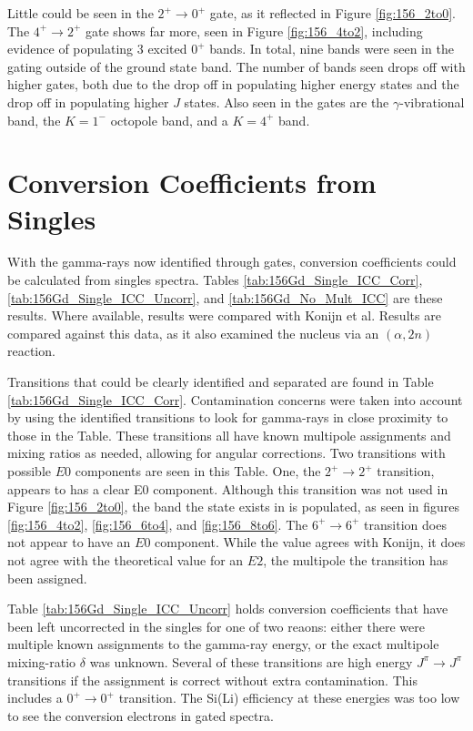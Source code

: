 Little could be seen in the $2^+\rightarrow0^+$ gate, as it reflected in Figure \ref{fig:156_2to0}. The $4^+\rightarrow2^+$ gate shows far more, seen in Figure \ref{fig:156_4to2}, including evidence of populating 3 excited $0^+$ bands. In total, nine bands were seen in the gating outside of the ground state band. The number of bands seen drops off with higher gates, both due to the drop off in populating higher energy states and the drop off in populating higher $J$ states. Also seen in the gates are the $\gamma$-vibrational band, the $K=1^-$ octopole band, and a $K=4^+$ band.

\section{Conversion Coefficients from Singles}

With the gamma-rays now identified through gates, conversion coefficients could be calculated from singles spectra. Tables \ref{tab:156Gd_Single_ICC_Corr}, \ref{tab:156Gd_Single_ICC_Uncorr}, and \ref{tab:156Gd_No_Mult_ICC} are these results. Where available, results were compared with Konijn et al\citep{konijn81:_156gd}. Results are compared against this data, as it also examined the nucleus via an $(\alpha,2n)$ reaction.

Transitions that could be clearly identified and separated are found in Table \ref{tab:156Gd_Single_ICC_Corr}. Contamination concerns were taken into account by using the identified transitions to look for gamma-rays in close proximity to those in the Table. These transitions all have known multipole assignments and mixing ratios as needed, allowing for angular corrections. Two transitions with possible $E0$ components are seen in this Table. One, the $2^+\rightarrow2^+$ transition, appears to has a clear E0 component. Although this transition was not used in Figure \ref{fig:156_2to0}, the band the state exists in is populated, as seen in figures \ref{fig:156_4to2}, \ref{fig:156_6to4}, and \ref{fig:156_8to6}. The $6^+\rightarrow6^+$ transition does not appear to have an $E0$ component. While the value agrees with Konijn\citep{konijn81:_156gd}, it does not agree with the theoretical value for an $E2$, the multipole the transition has been assigned.

\afterpage{\clearpage}

Table \ref{tab:156Gd_Single_ICC_Uncorr} holds conversion coefficients that have been left uncorrected in the singles for one of two reaons: either there were multiple known assignments to the gamma-ray energy, or the exact multipole mixing-ratio $\delta$ was unknown. Several of these transitions are high energy $J^\pi\rightarrow J^\pi$ transitions if the assignment is correct without extra contamination. This includes a $0^+\rightarrow0^+$ transition. The Si(Li) efficiency at these energies was too low to see the conversion electrons in gated spectra.

